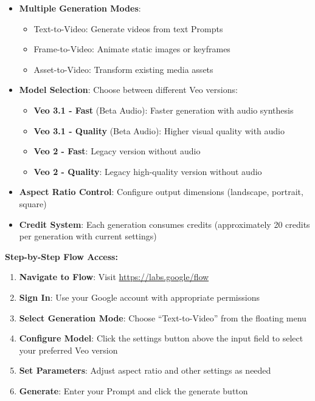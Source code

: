 \begin{itemize}
\item \textbf{Multiple Generation Modes}:
  \begin{itemize}
  \item Text-to-Video: Generate videos from text Prompts
  \item Frame-to-Video: Animate static images or keyframes
  \item Asset-to-Video: Transform existing media assets
  \end{itemize}

\item \textbf{Model Selection}: Choose between different Veo versions:
  \begin{itemize}
  \item \textbf{Veo 3.1 - Fast} (Beta Audio): Faster generation with audio synthesis
  \item \textbf{Veo 3.1 - Quality} (Beta Audio): Higher visual quality with audio
  \item \textbf{Veo 2 - Fast}: Legacy version without audio
  \item \textbf{Veo 2 - Quality}: Legacy high-quality version without audio
  \end{itemize}

\item \textbf{Aspect Ratio Control}: Configure output dimensions (landscape, portrait, square)

\item \textbf{Credit System}: Each generation consumes credits (approximately 20 credits per generation with current settings)
\end{itemize}

\textbf{Step-by-Step Flow Access:}

\begin{enumerate}
\item \textbf{Navigate to Flow}: Visit \url{https://labs.google/flow}
\item \textbf{Sign In}: Use your Google account with appropriate permissions
\item \textbf{Select Generation Mode}: Choose ``Text-to-Video'' from the floating menu
\item \textbf{Configure Model}: Click the settings button above the input field to select your preferred Veo version
\item \textbf{Set Parameters}: Adjust aspect ratio and other settings as needed
\item \textbf{Generate}: Enter your Prompt and click the generate button
\end{enumerate}

